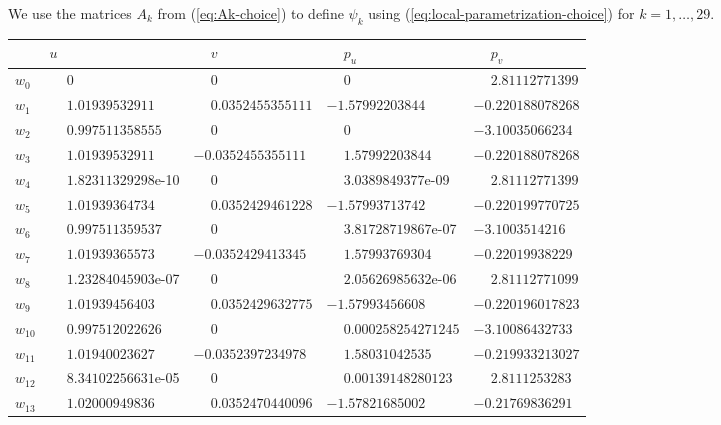\documentclass[1p]{article}
\begin{document}
We use the matrices $A_k$ from (\ref{eq:Ak-choice}) to define $\psi_k$ using (\ref{eq:local-parametrization-choice}) for $k=1,\ldots,29$.

\begin{table}[H]
    \centering
    \scriptsize
    \begin{tabular}{lllll}
        \hline
         & $u$ & $\phantom{-}v$ & $\phantom{-}p_u$ & $\phantom{-}p_v$ \\
        \hline
        $w_{0}$ & $\phantom{-}0$ & $\phantom{-}0$ & $\phantom{-}0$ & $\phantom{-}2.81112771399$ \\
        $w_{1}$ & $\phantom{-}1.01939532911$ & $\phantom{-}0.0352455355111$ & $-1.57992203844$ & $-0.220188078268$ \\
        $w_{2}$ & $\phantom{-}0.997511358555$ & $\phantom{-}0$ & $\phantom{-}0$ & $-3.10035066234$ \\
        $w_{3}$ & $\phantom{-}1.01939532911$ & $-0.0352455355111$ & $\phantom{-}1.57992203844$ & $-0.220188078268$ \\
        $w_{4}$ & $\phantom{-}1.82311329298$e-10 & $\phantom{-}0$ & $\phantom{-}3.0389849377$e-09 & $\phantom{-}2.81112771399$ \\
        $w_{5}$ & $\phantom{-}1.01939364734$ & $\phantom{-}0.0352429461228$ & $-1.57993713742$ & $-0.220199770725$ \\
        $w_{6}$ & $\phantom{-}0.997511359537$ & $\phantom{-}0$ & $\phantom{-}3.81728719867$e-07 & $-3.1003514216$ \\
        $w_{7}$ & $\phantom{-}1.01939365573$ & $-0.0352429413345$ & $\phantom{-}1.57993769304$ & $-0.22019938229$ \\
        $w_{8}$ & $\phantom{-}1.23284045903$e-07 & $\phantom{-}0$ & $\phantom{-}2.05626985632$e-06 & $\phantom{-}2.81112771099$ \\
        $w_{9}$ & $\phantom{-}1.01939456403$ & $\phantom{-}0.0352429632775$ & $-1.57993456608$ & $-0.220196017823$ \\
        $w_{10}$ & $\phantom{-}0.997512022626$ & $\phantom{-}0$ & $\phantom{-}0.000258254271245$ & $-3.10086432733$ \\
        $w_{11}$ & $\phantom{-}1.01940023627$ & $-0.0352397234978$ & $\phantom{-}1.58031042535$ & $-0.219933213027$ \\
        $w_{12}$ & $\phantom{-}8.34102256631$e-05 & $\phantom{-}0$ & $\phantom{-}0.00139148280123$ & $\phantom{-}2.8111253283$ \\
        $w_{13}$ & $\phantom{-}1.02000949836$ & $\phantom{-}0.0352470440096$ & $-1.57821685002$ & $-0.21769836291$ \\

\end{tabular}
\end{table}
\end{document}
